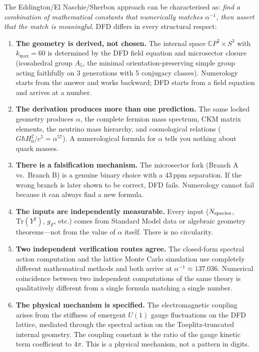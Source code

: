 \documentclass[11pt,a4paper]{article}
\begin{document}
The Eddington/El Naschie/Sherbon approach can be characterised as: \emph{find a combination of mathematical constants that numerically matches $\alpha^{-1}$, then assert that the match is meaningful}.  DFD differs in every structural respect:

\begin{enumerate}

\item \textbf{The geometry is derived, not chosen.}
The internal space $\mathbb{C}P^2 \times S^3$ with $k_{\max}=60$ is determined by the DFD field equation and microsector closure (icosahedral group $A_5$, the minimal orientation-preserving simple group acting faithfully on 3 generations with 5 conjugacy classes).  Numerology starts from the answer and works backward; DFD starts from a field equation and arrives at a number.

\item \textbf{The derivation produces more than one prediction.}
The same locked geometry produces $\alpha$, the complete fermion mass spectrum, CKM matrix elements, the neutrino mass hierarchy, and cosmological relations ($G\hbar H_0^2/c^5 = \alpha^{57}$).  A numerological formula for $\alpha$ tells you nothing about quark masses.

\item \textbf{There is a falsification mechanism.}
The microsector fork (Branch A vs.\ Branch B) is a genuine binary choice with a 43\,ppm separation.  If the wrong branch is later shown to be correct, DFD fails.  Numerology cannot fail because it can always find a new formula.

\item \textbf{The inputs are independently measurable.}
Every input ($N_{\rm species}$, $\mathrm{Tr}(Y^2)$, $g_F$, etc.) comes from Standard Model data or algebraic geometry theorems---not from the value of $\alpha$ itself.  There is no circularity.

\item \textbf{Two independent verification routes agree.}
The closed-form spectral action computation and the lattice Monte Carlo simulation use completely different mathematical methods and both arrive at $\alpha^{-1}\approx 137.036$.  Numerical coincidence between two independent computations of the same theory is qualitatively different from a single formula matching a single number.

\item \textbf{The physical mechanism is specified.}
The electromagnetic coupling arises from the stiffness of emergent $U(1)$ gauge fluctuations on the DFD lattice, mediated through the spectral action on the Toeplitz-truncated internal geometry.  The coupling constant is the ratio of the gauge kinetic term coefficient to $4\pi$.  This is a physical mechanism, not a pattern in digits.

\end{enumerate}
\end{document}

